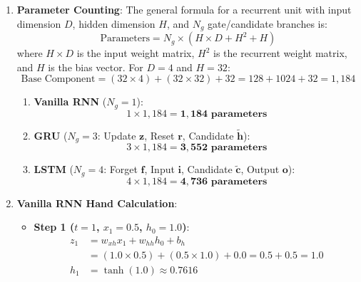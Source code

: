 \begin{enumerate}
    \item \textbf{Parameter Counting}:
    The general formula for a recurrent unit with input dimension $D$, hidden dimension $H$, and $N_g$ gate/candidate branches is:
    \begin{equation*}
    \text{Parameters} = N_g \times (H \times D + H^2 + H)
    \end{equation*}
    where $H \times D$ is the input weight matrix, $H^2$ is the recurrent weight matrix, and $H$ is the bias vector.
    For $D = 4$ and $H = 32$:
    \begin{equation*}
    \text{Base Component} = (32 \times 4) + (32 \times 32) + 32 = 128 + 1024 + 32 = 1{,}184
    \end{equation*}
    \begin{enumerate}[label=(\alph*)]
        \item \textbf{Vanilla RNN} ($N_g = 1$):
        \begin{equation*}
        1 \times 1{,}184 = \mathbf{1{,}184 \text{ parameters}}
        \end{equation*}
        \item \textbf{GRU} ($N_g = 3$: Update $\mathbf{z}$, Reset $\mathbf{r}$, Candidate $\tilde{\mathbf{h}}$):
        \begin{equation*}
        3 \times 1{,}184 = \mathbf{3{,}552 \text{ parameters}}
        \end{equation*}
        \item \textbf{LSTM} ($N_g = 4$: Forget $\mathbf{f}$, Input $\mathbf{i}$, Candidate $\tilde{\mathbf{c}}$, Output $\mathbf{o}$):
        \begin{equation*}
        4 \times 1{,}184 = \mathbf{4{,}736 \text{ parameters}}
        \end{equation*}
    \end{enumerate}

    \item \textbf{Vanilla RNN Hand Calculation}:
    \begin{itemize}
        \item \textbf{Step 1 ($t = 1$, $x_1 = 0.5$, $h_0 = 1.0$)}:
        \begin{align*}
        z_1 &= w_{xh} x_1 + w_{hh} h_0 + b_h \\
            &= (1.0 \times 0.5) + (0.5 \times 1.0) + 0.0 = 0.5 + 0.5 = 1.0 \\
        h_1 &= \tanh(1.0) \approx \mathbf{0.7616}
        \end{align*}


\end{itemize}
\end{enumerate}
